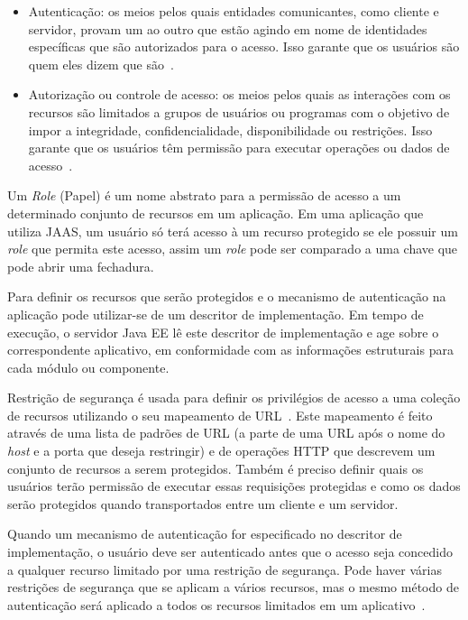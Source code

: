 \begin{itemize}
\item Autenticação: os meios pelos quais entidades comunicantes, como cliente e servidor, provam um ao outro que estão agindo em nome de identidades específicas que são autorizados para o acesso. Isso garante que os usuários são quem eles dizem que são~\cite{oracleJAAS}.

\item Autorização ou controle de acesso: os meios pelos quais as interações com os recursos são limitados a grupos de usuários ou programas com o objetivo de impor a integridade, confidencialidade, disponibilidade ou restrições. Isso garante que os usuários têm permissão para executar operações ou dados de acesso~\cite{oracleJAAS}.
\end{itemize}

Um \textit{Role} (Papel) é um nome abstrato para a permissão de acesso a um determinado conjunto de recursos em um aplicação. Em uma aplicação que utiliza JAAS, um usuário só terá acesso à um recurso protegido se ele possuir um \textit{role} que permita este acesso, assim um \textit{role} pode ser comparado a uma chave que pode abrir uma fechadura. 

Para definir os recursos que serão protegidos e o mecanismo de autenticação na aplicação pode utilizar-se de um descritor de implementação. Em tempo de execução, o servidor Java EE lê este descritor de implementação e age sobre o correspondente aplicativo, em conformidade com as informações estruturais para cada módulo ou componente.

Restrição de segurança é usada para definir os privilégios de acesso a uma coleção de recursos utilizando o seu mapeamento de URL~\cite{oracleJAAS}. Este mapeamento é feito através de uma lista de padrões de URL (a parte de uma URL após o nome do \textit{host} e a porta que deseja restringir) e de operações HTTP que descrevem um conjunto de recursos a serem protegidos. Também é preciso definir quais os usuários terão permissão de executar essas requisições protegidas e como os dados serão protegidos quando transportados entre um cliente e um servidor.

Quando um mecanismo de autenticação for especificado no descritor de implementação, o usuário deve ser autenticado antes que o acesso seja concedido a qualquer recurso limitado por uma restrição de segurança. Pode haver várias restrições de segurança que se aplicam a vários recursos, mas o mesmo método de autenticação será aplicado a todos os recursos limitados em um aplicativo~\cite{oracleJAAS}.

